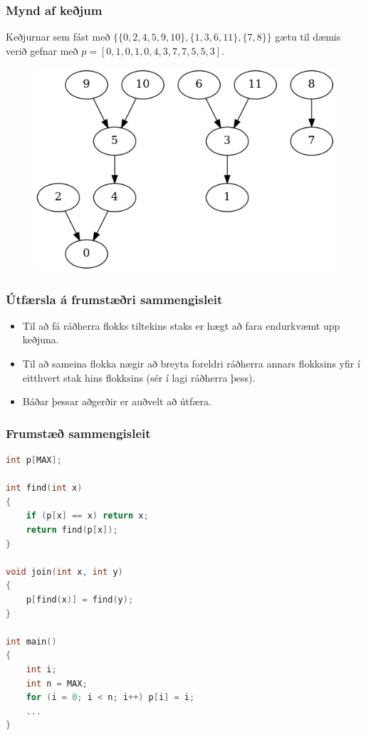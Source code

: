 \documentclass{beamer}
\begin{document}
\begin{frame}
\frametitle{Mynd af keðjum}
	Keðjurnar sem fást með $\{\{0, 2, 4, 5, 9, 10\}, \{1, 3, 6, 11\}, \{7, 8\}\}$ gætu til dæmis verið
	gefnar með $p = [0, 1, 0, 1, 0, 4, 3, 7, 7, 5, 5, 3]$.
	\begin{figure}
	\item<2->
		\includegraphics[scale=0.5]{mynd.png}
	\end{figure}
\end{frame}

\begin{frame}
\frametitle{Útfærsla á frumstæðri sammengisleit}
\begin{itemize}
	\item<1-> Til að fá ráðherra flokks tiltekins staks er hægt að fara endurkvæmt upp keðjuna.
	\item<2-> Til að sameina flokka nægir að breyta foreldri ráðherra annars flokksins yfir í
		eitthvert stak hins flokksins (sér í lagi ráðherra þess).
	\item<3-> Báðar þessar aðgerðir er auðvelt að útfæra.
\end{itemize}
\end{frame}

\begin{frame}[fragile]
	\frametitle{Frumstæð sammengisleit}
\tiny
\begin{lstlisting}[language=C++]
int p[MAX];

int find(int x)
{
	if (p[x] == x) return x;
	return find(p[x]);
}

void join(int x, int y)
{
	p[find(x)] = find(y);
}

int main()
{
	int i;
	int n = MAX;
	for (i = 0; i < n; i++) p[i] = i;
	...
}
\end{lstlisting}
\end{frame}
\end{document}
